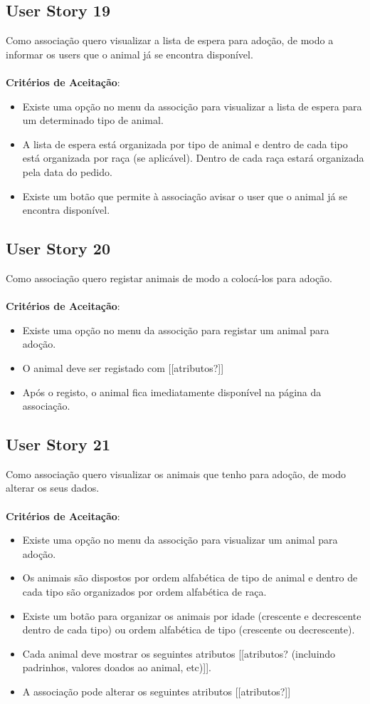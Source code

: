 \documentclass[a4paper,11pt]{article}
\begin{document}
\subsection{User Story 19}
Como associação quero visualizar a lista de espera para adoção, de modo a informar os users que o animal já se encontra disponível.\\\\
\textbf{Critérios de Aceitação}:
\begin{itemize}
  \item Existe uma opção no menu da associção para visualizar a lista de espera para um determinado tipo de animal.
  \item A lista de espera está organizada por tipo de animal e dentro de cada tipo está organizada por raça (se aplicável). Dentro de cada raça estará organizada pela data do pedido.
  \item Existe um botão que permite à associação avisar o user que o animal já se encontra disponível.
\end{itemize}

\subsection{User Story 20}
Como associação quero registar animais de modo a colocá-los para adoção.\\\\
\textbf{Critérios de Aceitação}:
\begin{itemize}
  \item Existe uma opção no menu da associção para registar um animal para adoção.
  \item O animal deve ser registado com [[atributos?]]
  \item Após o registo, o animal fica imediatamente disponível na página da associação.
\end{itemize}

\subsection{User Story 21}
Como associação quero visualizar os animais que tenho para adoção, de modo alterar os seus dados.\\\\
\textbf{Critérios de Aceitação}:
\begin{itemize}
  \item Existe uma opção no menu da associção para visualizar um animal para adoção.
  \item Os animais são dispostos por ordem alfabética de tipo de animal e dentro de cada tipo são organizados por ordem alfabética de raça.
  \item Existe um botão para organizar os animais por idade (crescente e decrescente dentro de cada tipo) ou ordem alfabética de tipo (crescente ou decrescente).
  \item Cada animal deve mostrar os seguintes atributos [[atributos? (incluindo padrinhos, valores doados ao animal, etc)]].
  \item A associação pode alterar os seguintes atributos [[atributos?]]
\end{itemize}
\end{document}
